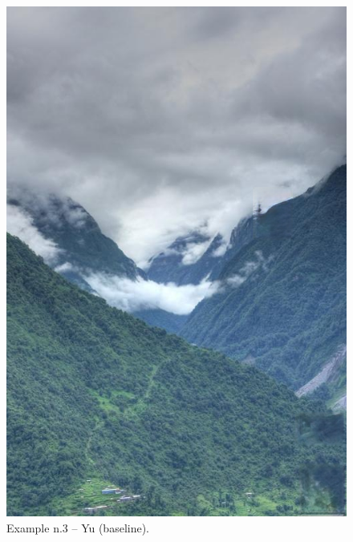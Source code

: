 \documentclass[a4paper, 11pt]{article}
\begin{document}
\begin{figure}
    \centering
    \includegraphics[width=.95\linewidth]{documentation/img/baseline/0027.png}
    \caption{Example n.3 -- Yu (baseline).}
    \label{img:ex_n.3_mask}
\end{figure}
\end{document}
